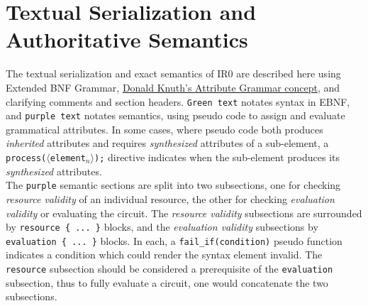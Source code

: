 \newpage
\section{Textual Serialization and Authoritative Semantics}\label{text}

\newcommand{\synFrag}[1]{{\color{SyntaxGreen}\texttt{#1}}}
\newcommand{\semFrag}[1]{{\color{SemanticPurple}\texttt{#1}}}
\newcommand{\synNonterm}[1]{\synFrag{$\langle$#1$\rangle$}}
\newcommand{\semNonterm}[1]{\semFrag{$\langle$#1$\rangle$}}
\newcommand{\semGlobal}[1]{\textit{\semFrag{#1}}}

\newcommand{\synNontermN}[2]{\synFrag{$\langle$#1$_{#2}\rangle$}}
\newcommand{\semNontermN}[2]{\semFrag{$\langle$#1$_{#2}\rangle$}}

\newcommand{\ttSyn}{\color{SyntaxGreen}}
\newcommand{\ttSem}{\color{SemanticPurple}}
\newcommand{\ttNonterm}[1]{\(\langle\)#1\(\rangle\)}
\newcommand{\ttNontermN}[2]{\(\langle\)#1\(\sb{#2}\rangle\)}
\newcommand{\ttGlobal}[1]{\textit{#1}}

The textual serialization and exact semantics of IR0 are described here using Extended BNF Grammar, \href{https://en.wikipedia.org/wiki/Attribute_grammar}{Donald Knuth's Attribute Grammar concept}, and clarifying comments and section headers.
\synFrag{Green text} notates syntax in EBNF, and \semFrag{purple text} notates semantics, using pseudo code to assign and evaluate grammatical attributes.
In some cases, where pseudo code both produces \textit{inherited} attributes and requires \textit{synthesized} attributes of a sub-element, a \semFrag{process(\semNontermN{element}{n});} directive indicates when the sub-element produces its \textit{synthesized} attributes.\\

The \semFrag{purple} semantic sections are split into two subsections, one for checking \textit{resource validity} of an individual resource, the other for checking \textit{evaluation validity} or evaluating the circuit.
The \textit{resource validity} subsections are surrounded by \semFrag{resource \{ ... \}} blocks, and the \textit{evaluation validity} subsections by \semFrag{evaluation \{ ... \}} blocks.
In each, a \semFrag{fail\_if(condition)} pseudo function indicates a condition which could render the syntax element invalid.
The \semFrag{resource} subsection should be considered a prerequisite of the \semFrag{evaluation} subsection, thus to fully evaluate a circuit, one would concatenate the two subsections.\\

